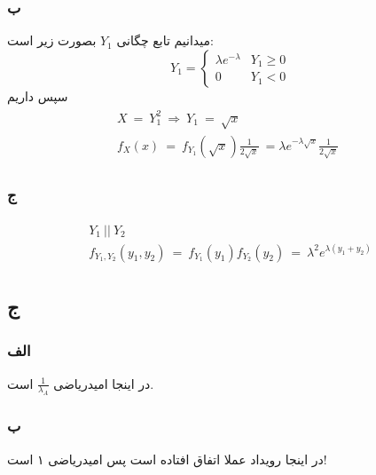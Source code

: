 \documentclass{article}[12pt]
\begin{document}
\subsubsection{ب}

میدانیم تابع چگانی 
$Y_1$
بصورت زیر است:
\begin{equation}
	Y_{1} =\begin{cases}
		\lambda e^{-\lambda } & Y_{1} \geqslant 0\\
		0 & Y_{1} < 0
	\end{cases}
\end{equation}
سپس داریم
\begin{equation}
	\begin{split}
		 \begin{array}{c}
			X\ =\ Y_{1}^{2} \ \Longrightarrow \ Y_{1} \ =\ \sqrt{x}\\
			f_{X}( x) \ =\ f_{Y_{1}}\left(\sqrt{x}\right)\frac{1}{2\sqrt{x}} \ =\lambda e^{-\lambda \sqrt{x}}\frac{1}{2\sqrt{x}} \ \ 
		\end{array}
	\end{split}
\end{equation}
\subsubsection{ج}	

\begin{equation}
	\begin{split}
		 \begin{array}{c}
			Y_{1} \ ||\ Y_{2} \ \\
			f_{Y_{1} ,Y_{2}}( y_{1} ,y_{2}) \ =\ f_{Y_{1}}( y_{1}) f_{Y_{2}}( y_{2}) \ =\ \lambda ^{2} e^{\lambda ( y_{1} +y_{2})}
		\end{array}
	\end{split}
\end{equation}


\subsection{ج}
\subsubsection{الف}
در اینجا امیدریاضی 
$\frac{1}{\lambda_A}$
است.
\subsubsection{ب}
در اینجا رویداد عملا اتفاق افتاده است پس امیدریاضی ۱ است!
\end{document}

